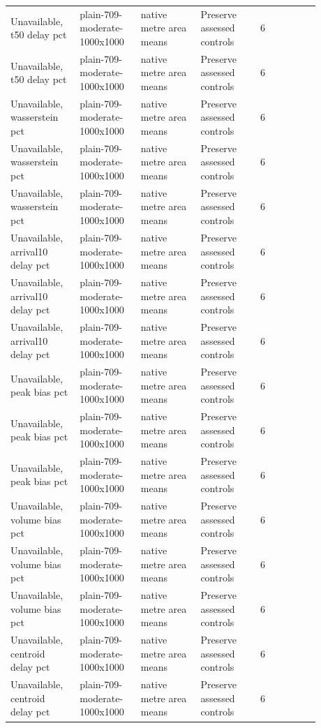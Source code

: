 \begin{longtable}{p{0.1760\linewidth}p{0.1760\linewidth}p{0.1760\linewidth}p{0.1760\linewidth}p{0.1760\linewidth}}
Unavailable, t50 delay pct & plain-709-moderate-1000x1000 & native metre area means & Preserve assessed controls & 6 \\
Unavailable, t50 delay pct & plain-709-moderate-1000x1000 & native metre area means & Preserve assessed controls & 6 \\
Unavailable, wasserstein pct & plain-709-moderate-1000x1000 & native metre area means & Preserve assessed controls & 6 \\
Unavailable, wasserstein pct & plain-709-moderate-1000x1000 & native metre area means & Preserve assessed controls & 6 \\
Unavailable, wasserstein pct & plain-709-moderate-1000x1000 & native metre area means & Preserve assessed controls & 6 \\
Unavailable, arrival10 delay pct & plain-709-moderate-1000x1000 & native metre area means & Preserve assessed controls & 6 \\
Unavailable, arrival10 delay pct & plain-709-moderate-1000x1000 & native metre area means & Preserve assessed controls & 6 \\
Unavailable, arrival10 delay pct & plain-709-moderate-1000x1000 & native metre area means & Preserve assessed controls & 6 \\
Unavailable, peak bias pct & plain-709-moderate-1000x1000 & native metre area means & Preserve assessed controls & 6 \\
Unavailable, peak bias pct & plain-709-moderate-1000x1000 & native metre area means & Preserve assessed controls & 6 \\
Unavailable, peak bias pct & plain-709-moderate-1000x1000 & native metre area means & Preserve assessed controls & 6 \\
Unavailable, volume bias pct & plain-709-moderate-1000x1000 & native metre area means & Preserve assessed controls & 6 \\
Unavailable, volume bias pct & plain-709-moderate-1000x1000 & native metre area means & Preserve assessed controls & 6 \\
Unavailable, volume bias pct & plain-709-moderate-1000x1000 & native metre area means & Preserve assessed controls & 6 \\
Unavailable, centroid delay pct & plain-709-moderate-1000x1000 & native metre area means & Preserve assessed controls & 6 \\
Unavailable, centroid delay pct & plain-709-moderate-1000x1000 & native metre area means & Preserve assessed controls & 6 \\

\end{longtable}
